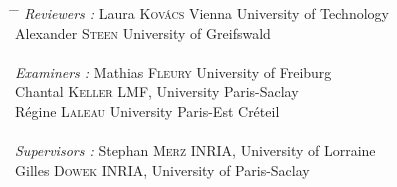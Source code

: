 \begin{titlepage}
\begin{addmargin}[-1cm]{-3cm}
        \begin{center}
        \vspace{1.5em}
        \begin{tabbing}
        \hspace{3cm} \= \hspace{5cm} \= \kill
        \textit{Reviewers :} \> Laura \textsc{Kovács} \> Vienna University of Technology \\
        \> Alexander \textsc{Steen} \> University of Greifswald \\
        \\
        \textit{Examiners :} \> Mathias \textsc{Fleury} \> University of Freiburg \\
        \> Chantal \textsc{Keller} \> LMF, University Paris-Saclay \\
        \> Régine \textsc{Laleau} \> University Paris-Est Créteil \\
        \\
        \textit{Supervisors :} \> Stephan \textsc{Merz} \> INRIA, University of Lorraine \\
        \> Gilles \textsc{Dowek} \> INRIA, University of Paris-Saclay \\
        \end{tabbing}
        \end{center}
  \end{addmargin}
\end{titlepage}
